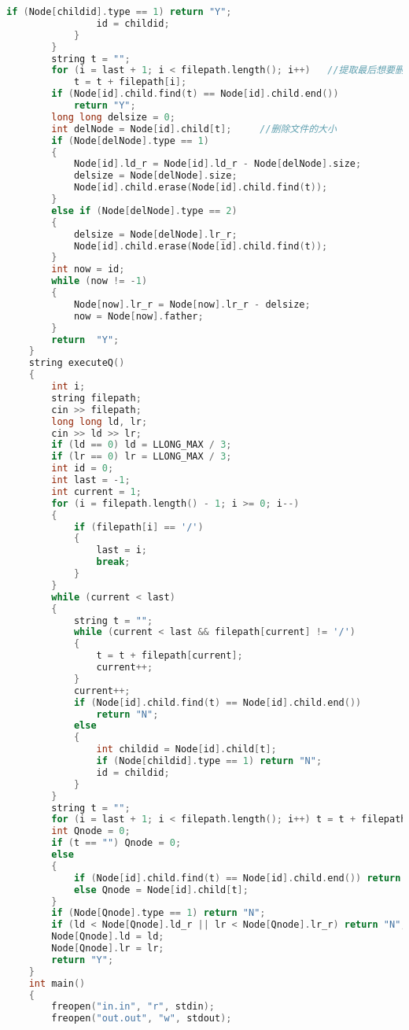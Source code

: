 \begin{lstlisting}[language=C++]
                if (Node[childid].type == 1) return "Y";
                id = childid;
            }
        }
        string t = "";
        for (i = last + 1; i < filepath.length(); i++)   //提取最后想要删除的文件名
            t = t + filepath[i];
        if (Node[id].child.find(t) == Node[id].child.end())
            return "Y";
        long long delsize = 0;
        int delNode = Node[id].child[t];     //删除文件的大小
        if (Node[delNode].type == 1)
        {
            Node[id].ld_r = Node[id].ld_r - Node[delNode].size;
            delsize = Node[delNode].size;
            Node[id].child.erase(Node[id].child.find(t));
        }
        else if (Node[delNode].type == 2)
        {
            delsize = Node[delNode].lr_r;
            Node[id].child.erase(Node[id].child.find(t));
        }
        int now = id;
        while (now != -1)
        {
            Node[now].lr_r = Node[now].lr_r - delsize;
            now = Node[now].father;
        }
        return  "Y";
    }
    string executeQ()
    {
        int i;
        string filepath;
        cin >> filepath;
        long long ld, lr;
        cin >> ld >> lr;
        if (ld == 0) ld = LLONG_MAX / 3;
        if (lr == 0) lr = LLONG_MAX / 3;
        int id = 0;
        int last = -1;
        int current = 1;
        for (i = filepath.length() - 1; i >= 0; i--)
        {
            if (filepath[i] == '/')
            {
                last = i;
                break;
            }
        }
        while (current < last)
        {
            string t = "";
            while (current < last && filepath[current] != '/')
            {
                t = t + filepath[current];
                current++;
            }
            current++;
            if (Node[id].child.find(t) == Node[id].child.end())
                return "N";
            else
            {
                int childid = Node[id].child[t];
                if (Node[childid].type == 1) return "N";
                id = childid;
            }
        }
        string t = "";
        for (i = last + 1; i < filepath.length(); i++) t = t + filepath[i];
        int Qnode = 0;
        if (t == "") Qnode = 0;
        else
        {
            if (Node[id].child.find(t) == Node[id].child.end()) return "N";
            else Qnode = Node[id].child[t];
        }
        if (Node[Qnode].type == 1) return "N";
        if (ld < Node[Qnode].ld_r || lr < Node[Qnode].lr_r) return "N";
        Node[Qnode].ld = ld;
        Node[Qnode].lr = lr;
        return "Y";
    }
    int main()
    {
        freopen("in.in", "r", stdin);
        freopen("out.out", "w", stdout);

\end{lstlisting}
